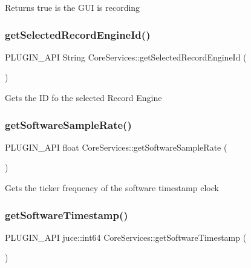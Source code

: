 Returns true is the G\+UI is recording \mbox{\label{namespace_core_services_a03eb76579ab53edf169064232a0e2b62}} 
\subsubsection{\texorpdfstring{get\+Selected\+Record\+Engine\+Id()}{getSelectedRecordEngineId()}}
{\footnotesize\ttfamily P\+L\+U\+G\+I\+N\+\_\+\+A\+PI String Core\+Services\+::get\+Selected\+Record\+Engine\+Id (\begin{DoxyParamCaption}{ }\end{DoxyParamCaption})}

Gets the ID fo the selected Record Engine \mbox{\label{namespace_core_services_a1ce836de202979c7c8a8e4f4d42c87f4}} 
\subsubsection{\texorpdfstring{get\+Software\+Sample\+Rate()}{getSoftwareSampleRate()}}
{\footnotesize\ttfamily P\+L\+U\+G\+I\+N\+\_\+\+A\+PI float Core\+Services\+::get\+Software\+Sample\+Rate (\begin{DoxyParamCaption}{ }\end{DoxyParamCaption})}

Gets the ticker frequency of the software timestamp clock \mbox{\label{namespace_core_services_ad1083e5525ad9ebd19afd9364f122059}} 
\subsubsection{\texorpdfstring{get\+Software\+Timestamp()}{getSoftwareTimestamp()}}
{\footnotesize\ttfamily P\+L\+U\+G\+I\+N\+\_\+\+A\+PI juce\+::int64 Core\+Services\+::get\+Software\+Timestamp (\begin{DoxyParamCaption}{ }\end{DoxyParamCaption})}

